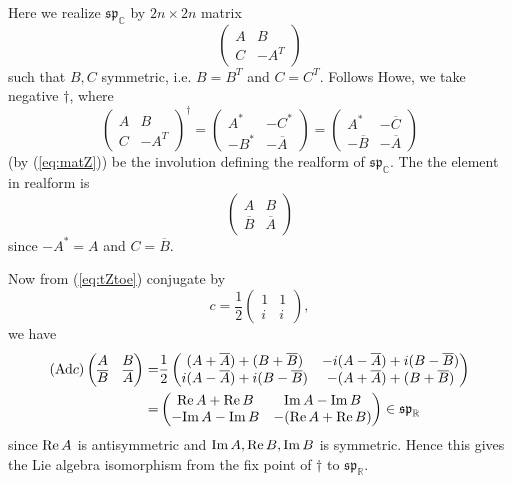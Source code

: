 \documentclass[12pt]{article}
\def\bR{{\mathbb{R}}}
\def\bC{{\mathbb{C}}}
\def\sp{{\mathfrak{sp}}}
\def\Ad{{\rm Ad}}
\def\Ad{\mathrm{Ad}}
\def\real{{\rm Re\,}}
\def\imag{{\rm Im\,}}
\begin{document}
Here we realize $\sp_\bC$ by $2n\times 2n$ matrix
\[
\begin{pmatrix}
A & B \\
C & -A^T
\end{pmatrix}
\]
such that $B,C$ symmetric, i.e. $B=B^T$ and $C= C^T$.
Follows Howe\cite{Howe1985}, we take negative $\dagger$, where 
\[
\begin{pmatrix}
A & B\\
C & -A^T 
\end{pmatrix}^\dagger
=
\begin{pmatrix}
A^* & -C^*\\
-B^* & -\overline{A}
\end{pmatrix}
=\begin{pmatrix}
A^* & -\overline{C}\\
-\overline{B} & -\overline{A}
\end{pmatrix}
\]
(by (\ref{eq:matZ})) be the involution defining the realform of $\sp_\bC$.
The the element in realform is 
\[
\begin{pmatrix}
A & B\\
\overline{B} & \overline{A}
\end{pmatrix}
\]
since $ -A^* = A$ and $C=\overline{B}$.

Now from (\ref{eq:tZtoe})  conjugate by 
\[c = \frac{1}{2}
\begin{pmatrix}
1 & 1\\
i & i
\end{pmatrix},
\]
we have 
\[
\begin{split}
(\Ad c)
\begin{pmatrix}
A & B\\
\overline{B} & \overline{A}
\end{pmatrix}
=& \frac{1}{2}
\begin{pmatrix}
(A + \overline{A}) + (B +\overline{B}) &-i(A-\overline{A}) +i(B-\overline{B})\\
i(A-\overline{A}) + i(B-\overline{B})& -(A + \overline{A}) + (B +\overline{B})
\end{pmatrix}\\
=&\begin{pmatrix}
\real A  + \real B & \imag A - \imag B\\
-\imag A -\imag B & -(\real A+\real B)  
\end{pmatrix}
\in \sp_\bR
\end{split}
\]
since $\real A$ is antisymmetric and $\imag A, \real B, \imag B$ is symmetric. 
Hence this gives the Lie algebra isomorphism from the fix point of $\dagger$ 
to $\sp_\bR$. 
\end{document}
